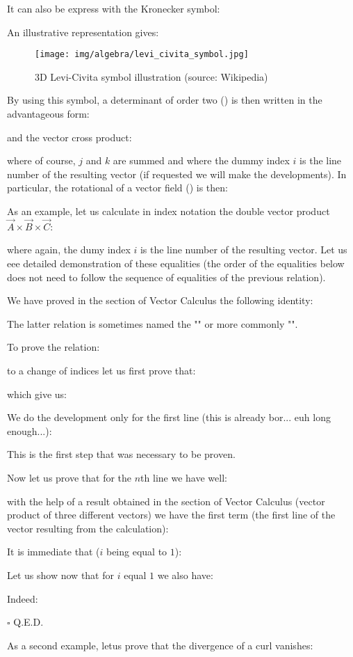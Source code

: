 	It can also be express with the Kronecker symbol:
	
	
	An illustrative representation gives:
	\begin{figure}[H]
		\centering
		\texttt{[image: img/algebra/levi\_civita\_symbol.jpg]}
		\caption{3D Levi-Civita symbol illustration (source: Wikipedia)}
	\end{figure}
	By using this symbol, a determinant of order two () is then written in the advantageous form:
	
	and the vector cross product:
	
	where of course, $j$ and $k$ are summed and where the dummy index $i$ is the line number of the resulting vector (if requested we will make the developments). In particular, the rotational of a vector field () is then:
	   
	As an example, let us calculate in index notation the double vector product $\vec{A}\times\vec{B}\times\vec{C}$:
	 
	where again, the dumy index $i$ is the line number of the resulting vector. Let us eee detailed demonstration of these equalities (the order of the equalities below does not need to follow the sequence of equalities of the previous relation).
	\begin{dem}
	We have proved in the section of Vector Calculus the following identity:
	
	\begin{tcolorbox}[title=Remark,colframe=black,arc=10pt]
	The latter relation is sometimes named the "" or more commonly "".
	\end{tcolorbox}	
	To prove the relation:
	
	to a change of indices let us first prove that:
	
	which give us:
	
	We do the development only for the first line (this is already bor... euh long enough...):
	
	This is the first step that was necessary to be proven.
	
	Now let us prove that for the $n$th line we have well:
	
	with the help of a result obtained in the section of Vector Calculus (vector product of three different vectors) we have the first term (the first line of the vector resulting from the calculation):
	
	It is immediate that ($i$ being equal to $1$):
	
	Let us show now that for $i$ equal $1$ we also have:
	
	Indeed:
	
	\begin{flushright}
		$\square$  Q.E.D.
	\end{flushright}
	\end{dem}
	As a second example, letus prove that the divergence of a curl vanishes:
	
